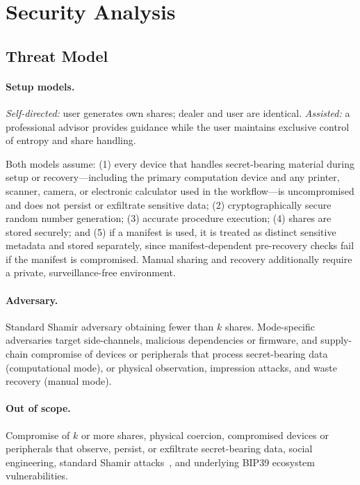 \documentclass[11pt]{article}
\begin{document}
\section{Security Analysis}
\label{sec:security}

\subsection{Threat Model}
\label{sec:threat-model}

\paragraph{Setup models.} \emph{Self-directed:} user generates own shares; dealer and user are identical. \emph{Assisted:} a professional advisor provides guidance while the user maintains exclusive control of entropy and share handling.

Both models assume: (1) every device that handles secret-bearing material during setup or recovery---including the primary computation device and any printer, scanner, camera, or electronic calculator used in the workflow---is uncompromised and does not persist or exfiltrate sensitive data; (2) cryptographically secure random number generation; (3) accurate procedure execution; (4) shares are stored securely; and (5) if a manifest is used, it is treated as distinct sensitive metadata and stored separately, since manifest-dependent pre-recovery checks fail if the manifest is compromised. Manual sharing and recovery additionally require a private, surveillance-free environment.

\paragraph{Adversary.} Standard Shamir adversary obtaining fewer than $k$ shares. Mode-specific adversaries target side-channels, malicious dependencies or firmware, and supply-chain compromise of devices or peripherals that process secret-bearing data (computational mode), or physical observation, impression attacks, and waste recovery (manual mode).

\paragraph{Out of scope.} Compromise of $k$ or more shares, physical coercion, compromised devices or peripherals that observe, persist, or exfiltrate secret-bearing data, social engineering, standard Shamir attacks~\cite{shamir1979,stinson2006}, and underlying BIP39 ecosystem vulnerabilities.
\end{document}
